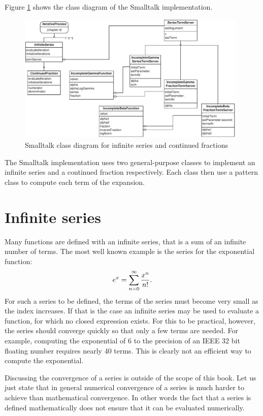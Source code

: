 Figure \ref{fig:StSeriesClass} shows the class diagram of the Smalltalk
implementation.

\begin{figure}
\centering\includegraphics[width=11cm]{Figures/SeriesClassDiagram}
\caption{Smalltalk class diagram for infinite series and continued
fractions}\label{fig:StSeriesClass}
\end{figure}

The Smalltalk implementation uses two general-purpose classes to
implement an infinite series and a continued fraction
respectively. Each class then use a  pattern
class \cite{GoF} to compute each term of the expansion.

\section{Infinite series}
Many functions are defined with an infinite series, that is a sum
of an infinite number of terms. The most well known example is the
series for the exponential function:
\begin{equation}
  e^x=\sum_{n=0}^{\infty}{x^n \over n!}.
\end{equation}
For such a series to be defined, the terms of the series must
become very small as the index increases. If that is the case an
infinite series may be used to evaluate a function, for which no
closed expression exists. For this to be practical, however, the
series should converge quickly so that only a few terms are
needed. For example, computing the exponential of 6 to the
precision of an IEEE 32 bit floating number requires nearly 40
terms. This is clearly not an efficient way to compute the
exponential.

Discussing the convergence of a series is outside of the scope of
this book. Let us just state that in general numerical convergence
of a series is much harder to achieve than mathematical
convergence. In other words the fact that a series is defined
mathematically does not ensure that it can be evaluated
numerically.

